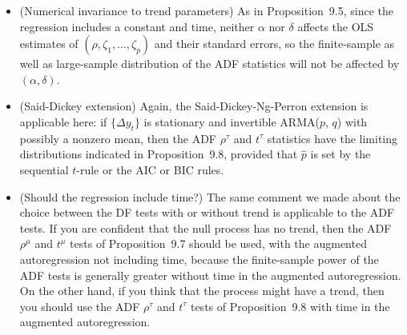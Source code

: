 \begin{itemize}
\item (Numerical invariance to trend parameters) \enspace As in Proposition~9.5, since the
regression includes a constant and time, neither $\alpha$ nor $\delta$ affects the OLS estimates of $(\rho, \zeta_1, \ldots, \zeta_p)$ and their standard errors, so the finite-sample as well as
large-sample distribution of the ADF statistics will not be affected by $(\alpha, \delta)$.

\item (Said-Dickey extension) \enspace Again, the Said-Dickey-Ng-Perron extension is
applicable here: if $\{\Delta y_t\}$ is stationary and invertible ARMA($p$, $q$) with possibly
a nonzero mean, then the ADF $\rho^\tau$ and $t^\tau$ statistics have the limiting distributions
indicated in Proposition~9.8, provided that $\hat{p}$ is set by the sequential $t$-rule or the AIC or BIC rules.

\item (Should the regression include time?) \enspace The same comment we made about the
choice between the DF tests with or without trend is applicable to the ADF tests.
If you are confident that the null process has no trend, then the ADF $\rho^\mu$ and $t^\mu$
tests of Proposition~9.7 should be used, with the augmented autoregression not
including time, because the finite-sample power of the ADF tests is generally
greater without time in the augmented autoregression. On the other hand, if you
think that the process might have a trend, then you should use the ADF $\rho^\tau$ and
$t^\tau$ tests of Proposition~9.8 with time in the augmented autoregression.
\end{itemize}

